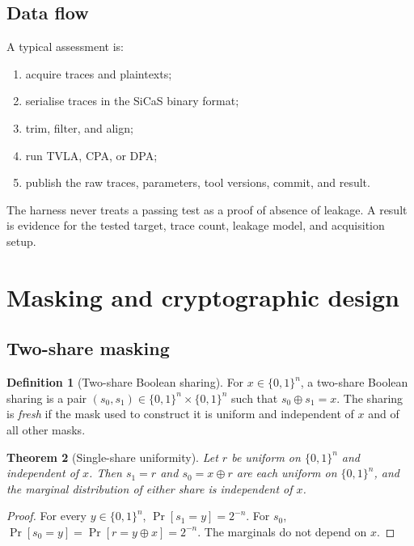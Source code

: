 \documentclass[11pt,a4paper]{article}
\newcommand{\bits}{\{0,1\}}
\newcommand{\Prb}{\Pr}
\theoremstyle{plain}
\newtheorem{theorem}{Theorem}[section]
\theoremstyle{definition}
\newtheorem{definition}[theorem]{Definition}
\theoremstyle{remark}
\begin{document}
\subsection{Data flow}

A typical assessment is:

\begin{enumerate}[leftmargin=1.5em]
  \item acquire traces and plaintexts;
  \item serialise traces in the SiCaS binary format;
  \item trim, filter, and align;
  \item run TVLA, CPA, or DPA;
  \item publish the raw traces, parameters, tool versions, commit, and result.
\end{enumerate}

The harness never treats a passing test as a proof of absence of leakage. A result is
evidence for the tested target, trace count, leakage model, and acquisition setup.

\section{Masking and cryptographic design}\label{sec:design}

\subsection{Two-share masking}

\begin{definition}[Two-share Boolean sharing]\label{def:sharing}
For \(x\in\bits^n\), a two-share Boolean sharing is a pair
\((s_0,s_1)\in\bits^n\times\bits^n\) such that \(s_0\oplus s_1=x\). The sharing is
\emph{fresh} if the mask used to construct it is uniform and independent of \(x\) and
of all other masks.
\end{definition}

\begin{theorem}[Single-share uniformity]\label{thm:uniform}
Let \(r\) be uniform on \(\bits^n\) and independent of \(x\). Then
\(s_1=r\) and \(s_0=x\oplus r\) are each uniform on \(\bits^n\), and the marginal
distribution of either share is independent of \(x\).
\end{theorem}

\begin{proof}
For every \(y\in\bits^n\), \(\Prb[s_1=y]=2^{-n}\). For \(s_0\),
\(\Prb[s_0=y]=\Prb[r=y\oplus x]=2^{-n}\). The marginals do not depend on \(x\).
\end{proof}
\end{document}
